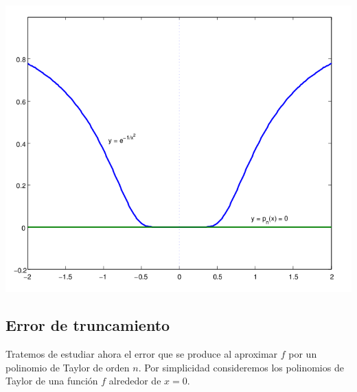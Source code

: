 \centerline{\includegraphics[width=.6\textwidth]{pics/taylor-patologico.png}}

\subsection{Error de truncamiento}

Tratemos de estudiar ahora el error que se produce al aproximar $f$ por un polinomio de Taylor de orden $n$. Por simplicidad consideremos los polinomios de Taylor de una función $f$ alrededor de $x=0$.

